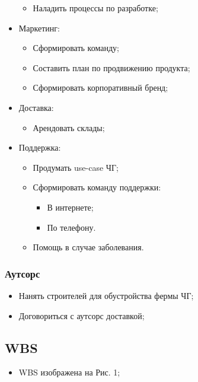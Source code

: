 \documentclass[a4paper,10pt]{article}
\begin{document}
\begin{itemize}
\begin{itemize}
                \item Наладить процессы по разработке;
            \end{itemize}
        \item Маркетинг:
            \begin{itemize}
                \item Сформировать команду;
                \item Составить план по продвижению продукта;
                \item Сформировать корпоративный бренд;
            \end{itemize}
        \item Доставка:
            \begin{itemize}
                \item Арендовать склады;
            \end{itemize}
        \item Поддержка:
            \begin{itemize}
                \item Продумать use-case ЧГ;
                \item Сформировать команду поддержки:
                    \begin{itemize}
                        \item В интернете;
                        \item По телефону.
                    \end{itemize}
                \item Помощь в случае заболевания.
            \end{itemize}
    \end{itemize}


\subsubsection{Аутсорс}

    \begin{itemize}
        \item Нанять строителей для обустройства фермы ЧГ;
        \item Договориться с аутсорс доставкой;
    \end{itemize}

\subsection{WBS}

    \begin{itemize}
        \item WBS изображена на Рис. 1;
    \end{itemize}
\end{document}
